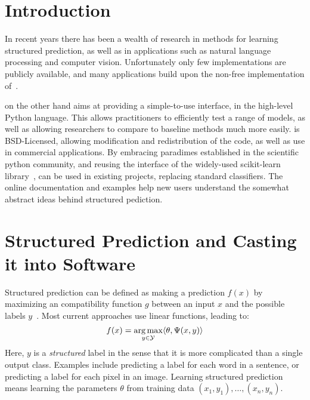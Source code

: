 \section{Introduction}
In recent years there has been a wealth of research in methods for learning structured prediction,
as well as in applications such as natural language processing and computer vision.
Unfortunately only few implementations are publicly available, and many applications build upon
the non-free implementation of~\citet{joachims2009cutting}.

\pystruct on the other hand aims at providing a simple-to-use interface, in the high-level Python language.
This allows practitioners to efficiently test a range of models, as well as allowing researchers
to compare to baseline methods much more easily.
\pystruct is BSD-Licensed, allowing modification and redistribution of the code,
as well as use in commercial applications.  By embracing paradimes established
in the scientific python community, and reusing the interface of the
widely-used {\sc scikit-learn} library~\citep{pedregosa2011scikit}, \pystruct
can be used in existing projects, replacing standard classifiers.
The online documentation and examples help new
users understand the somewhat abstract ideas behind structured pediction.



\section{Structured Prediction and Casting it into Software}\label{sec:api}

Structured prediction can be defined as making a prediction $f(x)$ by maximizing an
compatibility function $g$ between an input $x$ and the possible labels
$y$~\citep{nowozin2011structured}. Most current approaches use linear functions,
leading to:
\begin{equation}\label{eq:main_equation}
    f(x) = \operatorname*{arg\,max}_{y \in \mathcal{Y}} \langle \theta, \Psi(x, y) \rangle 
\end{equation}
Here, $y$ is a \emph{structured} label in the sense that it is more complicated than a single
output class. Examples include predicting a label for each word in a sentence, or predicting
a label for each pixel in an image.
Learning structured prediction means learning the parameters $\theta$ from training data
$(x_1, y_1), \dotsc, (x_n, y_n)$.

